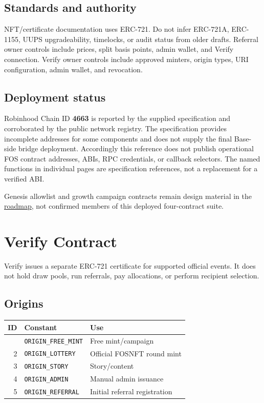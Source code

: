 \documentclass[
  10pt,
  letterpaper,
]{article}
\begin{document}
\subsection{Standards and authority}\label{standards-and-authority}

NFT/certificate documentation uses ERC-721. Do not infer ERC-721A,
ERC-1155, UUPS upgradeability, timelocks, or audit status from older
drafts. Referral owner controls include prices, split basis points,
admin wallet, and Verify connection. Verify owner controls include
approved minters, origin types, URI configuration, admin wallet, and
revocation.

\subsection{Deployment status}\label{deployment-status}

Robinhood Chain ID \textbf{4663} is reported by the supplied
specification and corroborated by the public network registry. The
specification provides incomplete addresses for some components and does
not supply the final Base-side bridge deployment. Accordingly this
reference does not publish operational FOS contract addresses, ABIs, RPC
credentials, or callback selectors. The named functions in individual
pages are specification references, not a replacement for a verified
ABI.

Genesis allowlist and growth campaign contracts remain design material
in the
\href{https://github.com/alirezaehteshampour/Fos-Doc/blob/main/content/docs/roadmap.mdx}{roadmap},
not confirmed members of this deployed four-contract suite.

\section{Verify Contract}\label{verify-contract}

Verify issues a separate ERC-721 certificate for supported official
events. It does not hold draw pools, run referrals, pay allocations, or
perform recipient selection.

\subsection{Origins}\label{origins}

\begin{longtable}[]{@{}rll@{}}
\toprule\noalign{}
ID & Constant & Use \\
\midrule\noalign{}
\endhead
\bottomrule\noalign{}
\endlastfoot
1 & \texttt{ORIGIN\_FREE\_MINT} & Free mint/campaign \\
2 & \texttt{ORIGIN\_LOTTERY} & Official FOSNFT round mint \\
3 & \texttt{ORIGIN\_STORY} & Story/content \\
4 & \texttt{ORIGIN\_ADMIN} & Manual admin issuance \\
5 & \texttt{ORIGIN\_REFERRAL} & Initial referral registration \\
\end{longtable}
\end{document}
